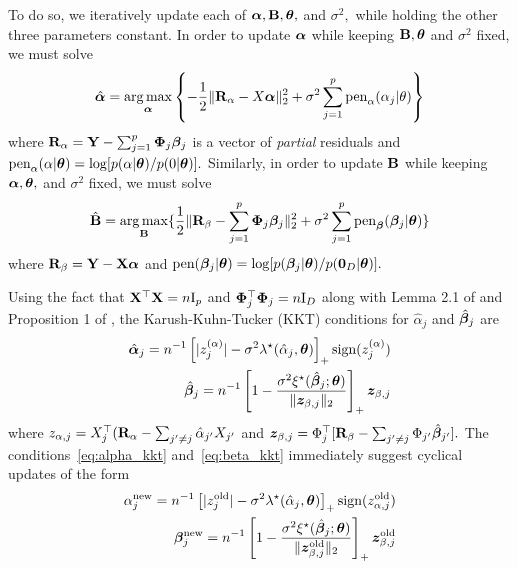 To do so, we iteratively update each of $\boldsymbol{\alpha}, \mathbf{B}, \boldsymbol{\theta},$ and $\sigma^{2},$ while holding the other three parameters constant.
In order to update $\boldsymbol{\alpha}$ while keeping $\mathbf{B}, \boldsymbol{\theta}$ and $\sigma^{2}$ fixed, we must solve
\begin{equation}
\label{eq:alpha_maximization}
\hat{\boldsymbol{\alpha}} = \operatorname*{arg\,max}_{\boldsymbol{\alpha}}\left\{-\frac{1}{2}\lVert \mathbf{R}_{\alpha} - X\boldsymbol{\alpha} \rVert_{2}^{2} + \sigma^{2}\sum_{j = 1}^{p}{\text{pen}_{\alpha}(\alpha_{j} \vert \theta)}\right\}
\end{equation}
where $\mathbf{R}_{\alpha} = \mathbf{Y} - \sum_{j = 1}^{p}{\boldsymbol{\Phi}_{j}\boldsymbol{\beta}_{j}}$ is a vector of \textit{partial} residuals and $\text{pen}_{\alpha}(\alpha \vert \boldsymbol{\theta}) = \log[p(\alpha\vert\boldsymbol{\theta})/p(0\vert\boldsymbol{\theta})].$
Similarly, in order to update $\mathbf{B}$ while keeping $\boldsymbol{\alpha}, \boldsymbol{\theta},$ and $\sigma^{2}$ fixed, we must solve
\begin{equation}
\label{eq:beta_maximization}
\hat{\mathbf{B}} = \operatorname*{arg\,max}_{\mathbf{B}}\{\frac{1}{2}\lVert \mathbf{R}_{\beta} - \sum_{j = 1}^{p}{\boldsymbol{\Phi}_{j}\boldsymbol{\beta}_{j}} \rVert_{2}^{2} + \sigma^{2}\sum_{j = 1}^{p}{\text{pen}_{\boldsymbol{\beta}}(\boldsymbol{\beta}_{j} \vert \boldsymbol{\theta})} \}
\end{equation}
where $\mathbf{R}_{\beta} = \mathbf{Y} - \mathbf{X} \boldsymbol{\alpha}$ and $\text{pen}(\boldsymbol{\beta}_{j} \vert \boldsymbol{\theta}) = \log[p(\boldsymbol{\beta}_{j} \vert \boldsymbol{\theta})/p(\mathbf{0}_{D}\lvert \boldsymbol{\theta})].$

Using the fact that $\mathbf{X}^{\top}\mathbf{X} = n\text{I}_{p}$ and $\boldsymbol{\Phi}_{j}^{\top}\boldsymbol{\Phi}_{j} = n\text{I}_{D}$ along with Lemma 2.1 of \citet{RockovaGeorge2018} and Proposition 1 of \citet{Bai2020}, the Karush-Kuhn-Tucker (KKT) conditions for $\hat{\alpha}_{j}$ and $\hat{\boldsymbol{\beta}}_{j}$ are
\begin{align}
\hat{\boldsymbol{\alpha}}_{j} = n^{-1}\left[ \lvert z^{(\alpha)}_{j} \rvert - \sigma^{2}\lambda^{\star}(\hat{\alpha}_{j}, \boldsymbol{\theta}) \right]_{+}\text{sign}(z^{(\alpha)}_{j}) \label{eq:alpha_kkt} \\
\hat{\boldsymbol{\beta}}_{j} = n^{-1}\left[1 - \frac{\sigma^{2}\xi^{\star}(\hat{\boldsymbol{\beta}}_{j}; \boldsymbol{\theta})}{\lVert \bm{z}_{\beta,j} \rVert_{2}}\right]_{+}\bm{z}_{\beta,j}
\label{eq:beta_kkt}
\end{align}
where $z_{\alpha,j} = X_{j}^{\top}(\mathbf{R}_{\alpha} - \sum_{j' \neq j}{\hat{\alpha}_{j'}X_{j'}}$ and $\bm{z}_{\beta,j} = \Phi_{j}^{\top}[\mathbf{R}_{\beta} - \sum_{j' \neq j}{\Phi_{j'}\hat{\boldsymbol{\beta}}_{j'}}].$
The conditions~\eqref{eq:alpha_kkt} and~\eqref{eq:beta_kkt} immediately suggest cyclical updates of the form
\begin{align}
\alpha^{\text{new}}_{j} = n^{-1}\left[ \lvert z^{\text{old}}_{j} \rvert - \sigma^{2}\lambda^{\star}(\hat{\alpha}_{j}, \boldsymbol{\theta}) \right]_{+}\text{sign}(z^{\text{old}}_{\alpha,j}) \label{eq:alpha_update} \\
\boldsymbol{\beta}_{j}^{\text{new}} = n^{-1}\left[1 - \frac{\sigma^{2}\xi^{\star}(\hat{\boldsymbol{\beta}}_{j}; \boldsymbol{\theta})}{\lVert \bm{z}^{\text{old}}_{\beta,j} \rVert_{2}}\right]_{+}\bm{z}^{\text{old}}_{\beta,j} \label{eq:beta_update}
\end{align}

